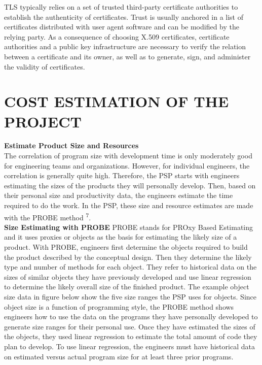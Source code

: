 \documentclass[hidelinks,a4paper,12pt]{article}
\begin{document}
TLS typically relies on a set of trusted third-party certificate authorities to establish the authenticity of certificates. Trust is usually anchored in a list of certificates distributed with user agent software and can be modified by the relying party. As a consequence of choosing \Gls{X.509 certificates}, certificate authorities and a public key infrastructure are necessary to verify the relation between a certificate and its owner, as well as to generate, sign, and administer the validity of certificates.
\\


\newpage
\section{\MakeUppercase{Cost Estimation of the Project}}

\noindent
\textbf{Estimate Product Size and Resources} \\
The correlation of program size with development time is only moderately good for engineering teams and organizations. However, for individual engineers, the correlation is generally quite high. Therefore, the PSP starts with engineers estimating the sizes of the products they will personally develop. Then, based on their personal size and productivity data, the engineers estimate the time required to do the work. In
the \Gls{PSP}, these size and resource estimates are made with the \Gls{PROBE} method \textsuperscript{ 7}.
\\

\noindent
\textbf{Size Estimating with PROBE}
PROBE stands for PROxy Based Estimating and it uses proxies or objects as the basis for estimating the likely size of a product. With PROBE, engineers first determine the objects required to build the product described by the conceptual design. Then they determine the likely type and number of methods for each object. They refer to historical data on the sizes of similar objects they have previously developed and use \gls{linear regression} to determine the likely overall size of the finished product. The example object size data in figure below show the five size ranges the PSP uses for objects. Since object size is a function of programming style, the PROBE method shows engineers how to use the data on the programs they have personally developed to generate size ranges for their personal use. Once they have estimated the sizes of the objects, they used linear regression to estimate the total amount of code they plan to develop. To use linear regression, the engineers must have historical data on estimated versus actual program size for at least three prior programs.
\end{document}
